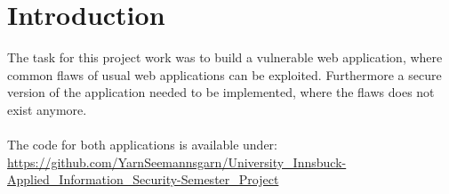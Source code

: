 \section{Introduction}

The task for this project work was to build a vulnerable web application, where common flaws of usual web applications can be exploited. Furthermore a secure version of the application needed to be implemented, where the flaws does not exist anymore.\\
\\
The code for both applications is available under:\\
\href{https://github.com/YarnSeemannsgarn/University_Innsbuck-Applied_Information_Security-Semester_Project}{https://git\allowbreak{}hub.\allowbreak{}com/\allowbreak{}Yarn\allowbreak{}Seemannsgarn/\allowbreak{}Uni\allowbreak{}ver\allowbreak{}si\allowbreak{}ty\_\allowbreak{}Inns\allowbreak{}buck-\allowbreak{}Applied\_\allowbreak{}In\allowbreak{}for\allowbreak{}ma\allowbreak{}tion\_\allowbreak{}Security-\allowbreak{}Se\allowbreak{}mes\allowbreak{}ter\_\allowbreak{}Pro\allowbreak{}ject}
